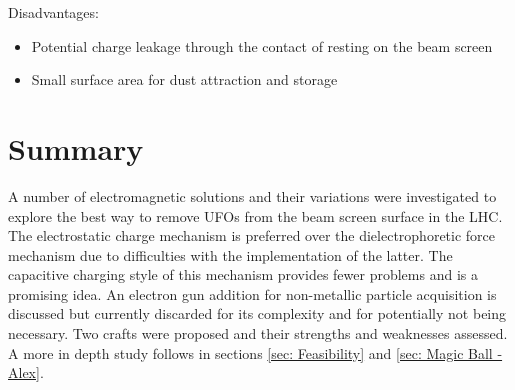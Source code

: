 \documentclass[../main.tex]{subfiles}
\begin{document}
Disadvantages:
\begin{itemize}
	\item Potential charge leakage through the contact of resting on the beam screen
	\item Small surface area for dust attraction and storage
\end{itemize}

\section{Summary}
A number of electromagnetic solutions and their variations were investigated to explore the best way to remove UFOs from the beam screen surface in the LHC.
The electrostatic charge mechanism is preferred over the dielectrophoretic force mechanism due to difficulties with the implementation of the latter.
The capacitive charging style of this mechanism provides fewer problems and is a promising idea.
An electron gun addition for non-metallic particle acquisition is discussed but currently discarded for its complexity and for potentially not being necessary.
Two crafts were proposed and their strengths and weaknesses assessed.
A more in depth study follows in sections \ref{sec: Feasibility} and \ref{sec: Magic Ball - Alex}.
\end{document}
